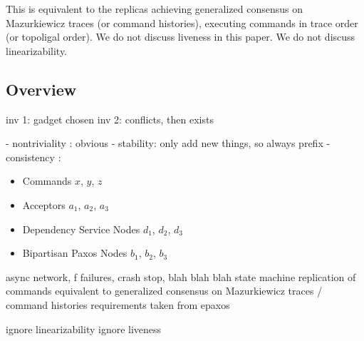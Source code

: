 This is equivalent to the replicas achieving generalized consensus on
Mazurkiewicz traces (or command histories), executing commands in trace order
(or topoligal order). We do not discuss liveness in this paper. We do not discuss linearizability.

\subsection{Overview}

inv 1: gadget chosen
inv 2: conflicts, then exists


- nontriviality : obvious
- stability: only add new things, so always prefix
- consistency :

\begin{itemize}
  \item Commands $x$, $y$, $z$
  \item Acceptors $a_1$, $a_2$, $a_3$
  \item Dependency Service Nodes $d_1$, $d_2$, $d_3$
  \item Bipartisan Paxos Nodes $b_1$, $b_2$, $b_3$
\end{itemize}



async network, f failures, crash stop, blah blah blah
state machine replication of commands
equivalent to generalized consensus on Mazurkiewicz traces / command histories
requirements taken from epaxos

ignore linearizability
ignore liveness

